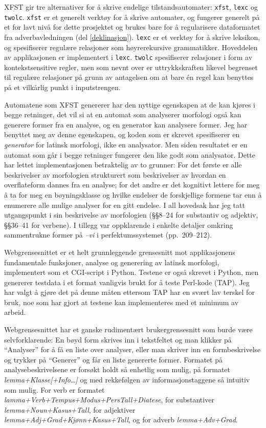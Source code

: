 \documentclass{article}
\let\form\emph
\let\prog\texttt
\let\w\emph
\begin{document}
XFST gir tre alternativer for \aa{} skrive endelige tilstandsautomater:
\prog{xfst}, \prog{lexc} og \prog{twolc}. \prog{xfst} er et generelt
verkt\o{}y for \aa{} skrive automater, og fungerer generelt p\aa{} et for lavt
niv\aa{} for dette prosjektet og brukes bare for \aa{} regularisere
dataformatet fra adverbavledningen (del \ref{deklinasjon}). \prog{lexc} er et
verkt\o{}y for \aa{} skrive leksikon, og spesifiserer regul\ae{}re relasjoner
som h\o{}yrerekursive grammatikker. Hoveddelen av applikasjonen er
implementert i \prog{lexc}. \prog{twolc} spesifiserer relasjoner i form av
kontekstsensitive regler, men som nevnt over er uttrykkskraften likevel
begrenset til regul\ae{}re relasjoner p\aa{} grunn av antagelsen om at bare
\'en regel kan benyttes p\aa{} et vilk\aa{}rlig punkt i inputstrengen.
\cite{xfst,twolc}

Automatene som XFST genererer har den nyttige egenskapen at de kan kj\o{}res i
begge retninger, det vil si at en automat som analyserer morfologi ogs\aa{}
kan generere former fra en analyse, og en generator kan analysere former. Jeg
har benyttet meg av denne egenskapen, og koden som er skrevet spesifiserer en
\emph{generator} for latinsk morfologi, ikke en analysator. Men siden
resultatet er en automat som g\aa{}r i begge retninger fungerer den like godt
som analysator. Dette har lettet implementasjonen betraktelig av to grunner:
For det f\o{}rste er alle beskrivelser av morfologien strukturert som
beskrivelser av hvordan en overflateform dannes fra en analyse; for det andre
er det kognitivt lettere for meg \aa{} ta for meg en b\o{}yningsklasse og
hvilke endelser de forskjellige formene tar enn \aa{} enumerere alle mulige
analyser for en gitt endelse. I all hovedsak har jeg tatt utgangspunkt i
 sin beskrivelse av morfologien (\S\S 8--24 for substantiv og
adjektiv, \S\S 36--41 for verbene). I tillegg var  oppklarende i
enkelte detaljer omkring sammentrukne former p\aa{} \w{--vi} i
perfektumssystemet (pp.~209--212).

Webgrensesnittet er et helt grunnleggende grensesnitt mot applikasjonens
fundamentale funksjoner, analyse og generering av latinsk morfologi,
implementert som et CGI-script i Python. Testene er ogs\aa{} skrevet i Python,
men genererer testdata i et format vanligvis brukt for \aa{} teste Perl-kode
(TAP). Jeg har valgt \aa{} gj\o{}re det p\aa{} denne m\aa{}ten ettersom TAP
har en sv\ae{}rt lav terskel for bruk, noe som har gjort at testene kan
implementeres med et minimum av arbeid.

Webgrensesnittet har et ganske rudiment\ae{}rt brukergrensesnitt som burde
v\ae{}re selvforklarende: En b\o{}yd form skrives inn i tekstfeltet og man
klikker p\aa{} ``Analyser'' for \aa{} f\aa{} en liste over analyser, eller man
skriver inn en formbeskrivelse og trykker p\aa{} ``Generer'' og f\aa{}r en
liste genererte former. Formatet p\aa{} analysebeskrivelsene er fors\o{}kt
holdt s\aa{} enhetlig som mulig, p\aa{} formatet
\form{lemma+Klasse[+Info\ldots]} og med rekkef\o{}lgen av informasjonstaggene
s\aa{} intuitiv som mulig. For verb er formatet
\form{lamma+Verb+Tempus+Modus+PersTall+Diatese}, for substantiver
\form{lemma\-+Noun\-+Kasus\-+Tall}, for adjektiver
\form{lemma\-+Adj\-+Grad\-+Kj\o{}nn\-+Kasus\-+Tall}, og for adverb
\form{lemma+Adv+Grad}.
\end{document}

